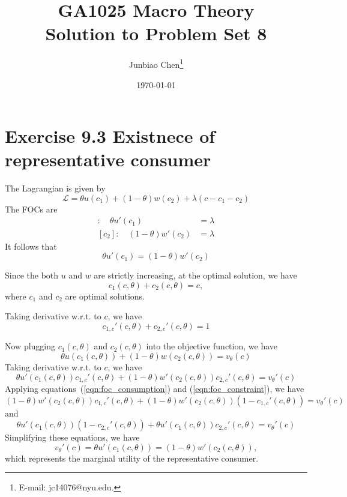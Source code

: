 \documentclass[11pt]{article}
\title{GA1025 Macro Theory \\Solution to Problem Set 8}
\author{
Junbiao Chen\thanks{E-mail: jc14076@nyu.edu.}
}
\date{\today}
\theoremstyle{definition}
\theoremstyle{boldtitle} %
\numberwithin{equation}{section}
\numberwithin{figure}{section}
\numberwithin{table}{section}
\begin{document}
\maketitle


\section{Exercise 9.3 Existnece of representative consumer}
The Lagrangian is given by 
\[
\mathcal{L} = \theta u(c_1) + (1 - \theta) w(c_2) + \lambda (c - c_1 - c_2)
\]
The FOCs are 
\begin{align*}
    [c_1]: \quad \theta u'(c_1) & = \lambda \\
    [c_2]: \quad (1 - \theta) w'(c_2) & = \lambda
\end{align*}
It follows that 
\begin{equation}
    \label{eqn:foc_consumption}
    \theta u'(c_1) = (1 - \theta) w'(c_2)
\end{equation}

Since the both $u$ and $w$ are strictly increasing, at the optimal solution, we have 
\[
c_1(c, \theta) + c_2(c, \theta) = c,
\]
where $c_1$ and $c_2$ are optimal solutions. 

Taking derivative w.r.t. to $c$, we have 
\begin{equation}
    \label{eqn:foc_constraint}
c_{1,c}'(c, \theta) + c_{2,c}'(c, \theta) = 1
\end{equation}

Now plugging $c_1(c, \theta)$ and $c_2(c, \theta)$ into the objective function, we have 
\[
\theta u(c_1(c, \theta)) + (1- \theta) w(c_2(c, \theta)) = v_\theta (c)
\]
Taking derivative w.r.t. to $c$, we have 
\[
\theta u'(c_1(c, \theta)) c_{1,c}'(c, \theta) + (1- \theta) w'(c_2(c, \theta)) c_{2,c}'(c, \theta) = v_\theta' (c)
\]
Applying equations~(\ref{eqn:foc_consumption}) and (\ref{eqn:foc_constraint}), we have 
\[
(1- \theta) w'(c_2(c, \theta)) c_{1,c}'(c, \theta) + (1- \theta) w'(c_2(c, \theta)) (1 - c_{1,c}'(c, \theta)) = v_\theta' (c)
\]
and
\[
\theta u'(c_1(c, \theta)) (1 - c_{2,c}'(c, \theta)) + \theta u'(c_1(c, \theta)) c_{2,c}'(c, \theta) = v_\theta' (c)
\]
Simplifying these equations, we have 
\[
v_\theta' (c) = \theta u'(c_1(c, \theta)) =  (1- \theta) w'(c_2(c, \theta)),
\]
which represents the marginal utility of the representative consumer.
\end{document}
